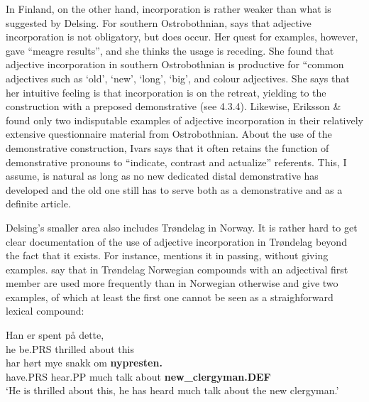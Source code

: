 
In Finland, on the other hand, incorporation is rather weaker than what is suggested by Delsing. For southern Ostrobothnian, \citet{Ivars2005} says that adjective incorporation is not obligatory, but does occur. Her quest for examples, however, gave “meagre results”, and she thinks the usage is receding. She found that adjective incorporation in southern Ostrobothnian is productive for “common adjectives such as  ‘old’,  ‘new’,  ‘long’,  ‘big’, and colour adjectives. She says that her intuitive feeling is that incorporation is on the retreat, yielding to the construction with a preposed demonstrative (see 4.3.4).  Likewise, Eriksson \& \citet{Rendahl1999} found only two indisputable examples of adjective incorporation in their relatively extensive questionnaire material from Ostrobothnian. About the use of the demonstrative construction, Ivars says that it often retains the function of demonstrative pronouns to “indicate, contrast and actualize” referents. This, I assume, is natural as long as no new dedicated distal demonstrative has developed and the old one still has to serve both as a demonstrative and as a definite article. 


Delsing’s smaller area also includes Trøndelag in Norway. It is rather hard to get clear documentation of the use of adjective incorporation in Trøndelag beyond the fact that it exists. For instance, \citet[161]{Vangsnes2003} mentions it in passing, without giving examples. \citet[161]{FaarlundEtAl1997} say that in Trøndelag Norwegian compounds with an adjectival first member are used more frequently than in Norwegian otherwise and give two examples, of which at least the first one cannot be seen as a straighforward lexical compound: 


\ea\label{}
\gll Han  er  spent  på  dette,\\
he  be.PRS  thrilled  about  this\\
\gll har  hørt  mye  snakk  om  \textbf{nypresten.} \\
have.PRS  hear.PP  much  talk  about   \textbf{new\_clergyman.DEF} \\
\glt ‘He is thrilled about this, he has heard much talk about the new clergyman.’
\z


